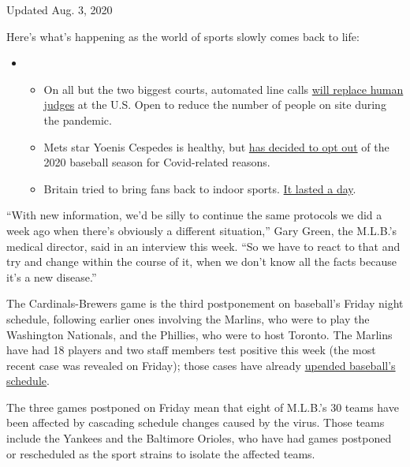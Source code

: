 Updated Aug. 3, 2020

Here's what's happening as the world of sports slowly comes back to
life:

\begin{itemize}
\item
  \begin{itemize}
  \tightlist
  \item
    On all but the two biggest courts, automated line calls
    \href{https://www.nytimes3xbfgragh.onion/2020/08/03/sports/tennis/us-open-hawkeye-line-judges.html?action=click\&pgtype=Article\&state=default\&region=MAIN_CONTENT_2\&context=storylines_keepup}{will
    replace human judges} at the U.S. Open to reduce the number of
    people on site during the pandemic.
  \item
    Mets star Yoenis Cespedes is healthy, but
    \href{https://www.nytimes3xbfgragh.onion/2020/08/02/sports/baseball/Yoenis-cespedes-opt-out-rule.html?action=click\&pgtype=Article\&state=default\&region=MAIN_CONTENT_2\&context=storylines_keepup}{has
    decided to opt out} of the 2020 baseball season for Covid-related
    reasons.
  \item
    Britain tried to bring fans back to indoor sports.
    \href{https://www.nytimes3xbfgragh.onion/2020/08/02/sports/snooker-world-championship.html?action=click\&pgtype=Article\&state=default\&region=MAIN_CONTENT_2\&context=storylines_keepup}{It
    lasted a day}.
  \end{itemize}
\end{itemize}

``With new information, we'd be silly to continue the same protocols we
did a week ago when there's obviously a different situation,'' Gary
Green, the M.L.B.'s medical director, said in an interview this week.
``So we have to react to that and try and change within the course of
it, when we don't know all the facts because it's a new disease.''

The Cardinals-Brewers game is the third postponement on baseball's
Friday night schedule, following earlier ones involving the Marlins, who
were to play the Washington Nationals, and the Phillies, who were to
host Toronto. The Marlins have had 18 players and two staff members test
positive this week (the most recent case was revealed on Friday); those
cases have already
\href{https://www.nytimes3xbfgragh.onion/2020/07/28/sports/baseball/marlins-outbreak-mlb-coronavirus.html}{upended
baseball's schedule}.

The three games postponed on Friday mean that eight of M.L.B.'s 30 teams
have been affected by cascading schedule changes caused by the virus.
Those teams include the Yankees and the Baltimore Orioles, who have had
games postponed or rescheduled as the sport strains to isolate the
affected teams.

